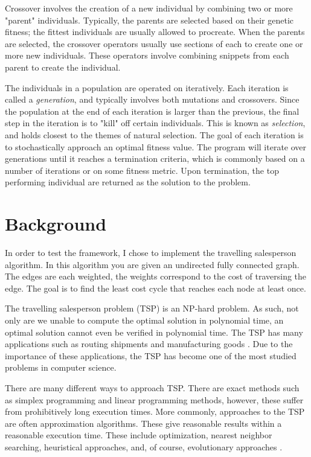 \documentclass[10pt,letterpaper]{article}
\begin{document}
Crossover involves the creation of a new individual by combining two or more "parent" individuals. Typically, the parents are selected based on their genetic fitness; the fittest individuals are usually allowed to procreate. When the parents are selected, the crossover operators usually use sections of each to create one or more new individuals. These operators involve combining snippets from each parent to create the individual.

The individuals in a population are operated on iteratively. Each iteration is called a \textit{generation}, and typically involves both mutations and crossovers. Since the population at the end of each iteration is larger than the previous, the final step in the iteration is to "kill" off certain individuals. This is known as \textit{selection}, and holds closest to the themes of natural selection. The goal of each iteration is to stochastically approach an optimal fitness value. The program will iterate over generations until it reaches a termination criteria, which is commonly based on a number of iterations or on some fitness metric. Upon termination, the top performing individual are returned as the solution to the problem.


\section{Background}
In order to test the framework, I chose to implement the travelling salesperson algorithm. In this algorithm you are given an undirected fully connected graph. The edges are each weighted, the weights correspond to the cost of traversing the edge. The goal is to find the least cost cycle that reaches each node at least once.

The travelling salesperson problem (TSP) is an NP-hard problem. As such, not only are we unable to compute the optimal solution in polynomial time, an optimal solution cannot even be verified in polynomial time. The TSP has many applications such as routing shipments and manufacturing goods \cite{tspuses}. Due to the importance of these applications, the TSP has become one of the most studied problems in computer science.

There are many different ways to approach TSP. There are exact methods such as simplex programming and linear programming methods, however, these suffer from prohibitively long execution times. More commonly, approaches to the TSP are often approximation algorithms. These give reasonable results within a reasonable execution time. These include optimization, nearest neighbor searching, heuristical approaches, and, of course, evolutionary approaches \cite{matai2010traveling}.
\end{document}

